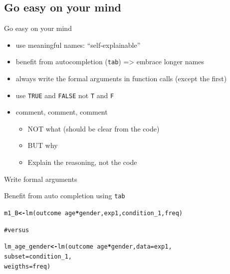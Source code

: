 \documentclass{beamer}\usepackage[]{graphicx}\usepackage[]{color}
\makeatletter
\newcommand{\hlcom}[1]{\textcolor[rgb]{1,0.502,0}{#1}}%
\newcommand{\hlopt}[1]{\textcolor[rgb]{1,0,0.502}{\textbf{#1}}}%
\newcommand{\hlstd}[1]{\textcolor[rgb]{0,0,0}{#1}}%
\newcommand{\hlkwb}[1]{\textcolor[rgb]{0.502,0.502,0.753}{\textbf{#1}}}%
\newcommand{\hlkwc}[1]{\textcolor[rgb]{0,0.502,0.753}{#1}}%
\newcommand{\hlkwd}[1]{\textcolor[rgb]{0,0.267,0.4}{#1}}%
\newenvironment{kframe}{%
 \def\at@end@of@kframe{}%
 \ifinner\ifhmode%
  \def\at@end@of@kframe{\end{minipage}}%
  \begin{minipage}{\columnwidth}%
 \fi\fi%
 \def\FrameCommand##1{\hskip\@totalleftmargin \hskip-\fboxsep
 \colorbox{shadecolor}{##1}\hskip-\fboxsep
     \hskip-\linewidth \hskip-\@totalleftmargin \hskip\columnwidth}%
 \MakeFramed {\advance\hsize-\width
   \@totalleftmargin\z@ \linewidth\hsize
   \@setminipage}}%
 {\par\unskip\endMakeFramed%
 \at@end@of@kframe}
\newenvironment{knitrout}{}{} %
\makeatother
\begin{document}
\subsection{Go easy on your mind}

\begin{frame}{Go easy on your mind}

\begin{itemize}
  \item use meaningful names: ``self-explainable''
  \item benefit from autocompletion (\texttt{tab}) => embrace longer names
  \item always write the formal arguments in function calls (except the first)
  \item use \texttt{TRUE} and \texttt{FALSE} not \texttt{T} and \texttt{F}
  \item comment, comment, comment
  \begin{itemize}
    \item NOT what (should be clear from the code)
    \item BUT why
    \item Explain the reasoning, not the code 
  \end{itemize}
\end{itemize}

\end{frame}


\begin{frame}[fragile]{Write formal arguments}

Benefit from auto completion using \texttt{tab}

\begin{knitrout}
\color{fgcolor}\begin{kframe}
\begin{alltt}
\hlstd{m1_B} \hlkwb{<-} \hlkwd{lm}\hlstd{(outcome} \hlopt{~} \hlstd{age}\hlopt{*}\hlstd{gender, exp1, condition_1, freq)}

\hlcom{# versus}

\hlstd{lm_age_gender} \hlkwb{<-} \hlkwd{lm}\hlstd{(outcome} \hlopt{~} \hlstd{age}\hlopt{*}\hlstd{gender,} \hlkwc{data} \hlstd{= exp1,}
                    \hlkwc{subset} \hlstd{= condition_1,}
                    \hlkwc{weigths} \hlstd{= freq)}
\end{alltt}
\end{kframe}
\end{knitrout}

\end{frame}
\end{document}
